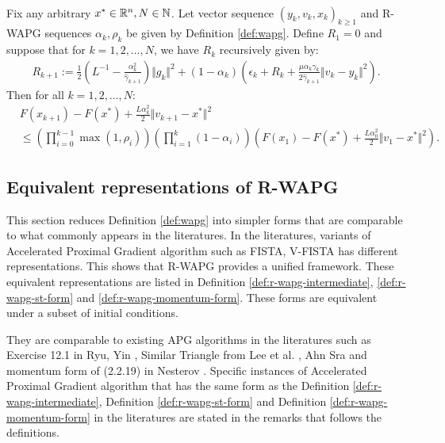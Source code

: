 \documentclass[12pt]{article}
\begin{document}
        \begin{proposition}\label{prop:wagp-convergence}\; \\
            Fix any arbitrary $x^* \in \mathbb R^n, N \in \mathbb N$. 
            Let vector sequence $(y_k, v_{k}, x_{k})_{k \ge 1}$ and R-WAPG sequences $\alpha_k, \rho_k$ be given by Definition \ref{def:wapg}. 
            Define $R_1 = 0$ and suppose that for $k = 1, 2, \ldots, N$, we have $R_k$ recursively given by: 
            \begin{align*}
                R_{k + 1}
                := 
                \frac{1}{2}\left(
                    L^{-1} - \frac{\alpha_k^2}{\hat \gamma_{k + 1}}
                \right)\Vert g_k\Vert^2
                + 
                (1 - \alpha_k)
                \left(
                    \epsilon_k + R_k + 
                    \frac{\mu\alpha_k\gamma_k}{2\hat \gamma_{k + 1}}
                    \Vert v_k - y_k\Vert^2
                \right). 
            \end{align*}
            Then for all $k = 1, 2, \ldots, N$: 
            \begin{align*}
                & F(x_{k + 1}) - F(x^*) + \frac{L \alpha_k^2}{2}\Vert v_{k + 1} - x^*\Vert^2
                \\
                &\le 
                \left(
                    \prod_{i = 0}^{k - 1} \max(1, \rho_{i})
                \right)
                \left(
                    \prod_{i = 1}^{k} \left(1  - \alpha_i\right)
                \right)
                \left(
                    F(x_1) - F(x^*) + \frac{L\alpha_0^2}{2}\Vert v_1 - x^*\Vert^2
                \right). 
            \end{align*}
        \end{proposition}
        
    \subsection{Equivalent representations of R-WAPG}\label{sec:rwapg-equiv-repr}
        This section reduces Definition \ref{def:wapg} into simpler forms that are comparable to what commonly appears in the literatures. 
        In the literatures, variants of Accelerated Proximal Gradient algorithm such as FISTA, V-FISTA has different representations. 
        This shows that R-WAPG provides a unified framework. 
        These equivalent representations are listed in Definition \ref{def:r-wapg-intermediate}, \ref{def:r-wapg-st-form} and \ref{def:r-wapg-momentum-form}. 
        These forms are equivalent under a subset of initial conditions. 
        \par
        They are comparable to existing APG algorithms in the literatures such as Exercise 12.1 in Ryu, Yin \cite{ryu_large-scale_2022}, Similar Triangle from Lee et al. \cite{lee_geometric_2021}, Ahn Sra \cite{ahn_understanding_2022} and momentum form of (2.2.19) in Nesterov \cite{nesterov_lectures_2018}. 
        Specific instances of Accelerated Proximal Gradient algorithm that has the same form as the Definition \ref{def:r-wapg-intermediate}, Definition \ref{def:r-wapg-st-form} and Definition \ref{def:r-wapg-momentum-form} in the literatures are stated in the remarks that follows the definitions. 
\end{document}
